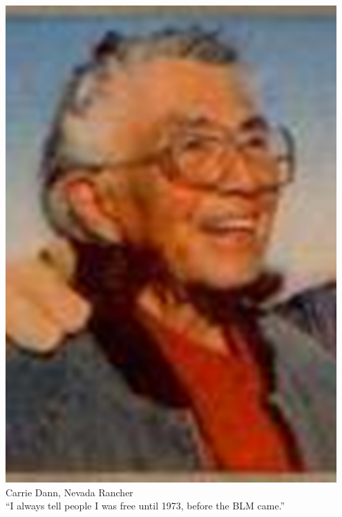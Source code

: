 \begin{frame}
    \begin{columns}[onlytextwidth]
            \centering
            \includegraphics[width=0.95\textwidth]{img/carrie-dann.png} \\
            Carrie Dann, Nevada Rancher \\

            ``I always tell people I was free until 1973, before the BLM came.''
    \end{columns}
\end{frame}


